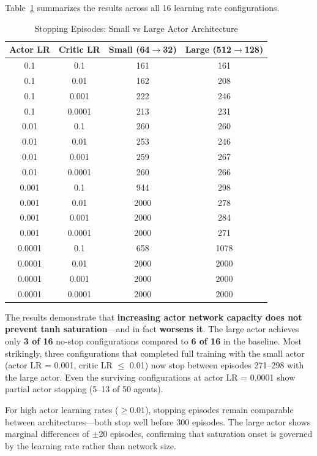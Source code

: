 Table~\ref{tab:large_actor} summarizes the results across all 16 learning rate configurations.

\begin{table}[htbp]
\caption{Stopping Episodes: Small vs Large Actor Architecture}
\label{tab:large_actor}
\centering
\small
\begin{tabular}{cccc}
\toprule
\textbf{Actor LR} & \textbf{Critic LR} & \textbf{Small (64$\rightarrow$32)} & \textbf{Large (512$\rightarrow$128)} \\
\midrule
0.1 & 0.1 & 161 & 161 \\
0.1 & 0.01 & 162 & 208 \\
0.1 & 0.001 & 222 & 246 \\
0.1 & 0.0001 & 213 & 231 \\
0.01 & 0.1 & 260 & 260 \\
0.01 & 0.01 & 253 & 246 \\
0.01 & 0.001 & 259 & 267 \\
0.01 & 0.0001 & 260 & 266 \\
0.001 & 0.1 & 944 & 298 \\
0.001 & 0.01 & 2000 & 278 \\
0.001 & 0.001 & 2000 & 284 \\
0.001 & 0.0001 & 2000 & 271 \\
0.0001 & 0.1 & 658 & 1078 \\
0.0001 & 0.01 & 2000 & 2000 \\
0.0001 & 0.001 & 2000 & 2000 \\
0.0001 & 0.0001 & 2000 & 2000 \\
\bottomrule
\end{tabular}
\end{table}

The results demonstrate that \textbf{increasing actor network capacity does not prevent tanh saturation}---and in fact \textbf{worsens it}. The large actor achieves only \textbf{3 of 16} no-stop configurations compared to \textbf{6 of 16} in the baseline. Most strikingly, three configurations that completed full training with the small actor (actor LR = 0.001, critic LR $\leq$ 0.01) now stop between episodes 271--298 with the large actor. Even the surviving configurations at actor LR = 0.0001 show partial actor stopping (5--13 of 50 agents).

For high actor learning rates ($\geq 0.01$), stopping episodes remain comparable between architectures---both stop well before 300 episodes. The large actor shows marginal differences of $\pm$20 episodes, confirming that saturation onset is governed by the learning rate rather than network size.

